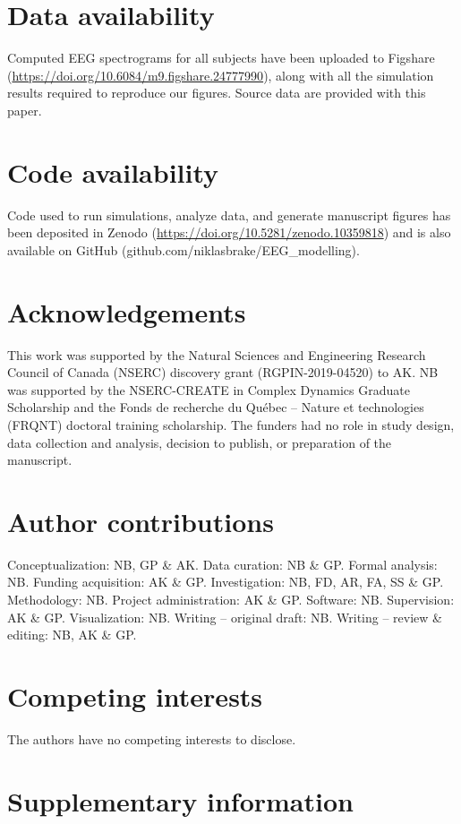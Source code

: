 \section{Data availability}
Computed EEG spectrograms for all subjects have been uploaded to Figshare\cite{Brake2023} (\url{https://doi.org/10.6084/m9.figshare.24777990}), along with all the simulation results required to reproduce our figures. Source data are provided with this paper.

\section{Code availability}
Code used to run simulations, analyze data, and generate manuscript figures\cite{niklas_brake_2023_10359818} has been deposited in Zenodo (\url{https://doi.org/10.5281/zenodo.10359818}) and is also available on GitHub (github.com/niklasbrake/EEG\_modelling).



\section{Acknowledgements}
This work was supported by the Natural Sciences and Engineering Research Council of Canada (NSERC) discovery grant (RGPIN-2019-04520) to AK. NB was supported by the NSERC-CREATE in Complex Dynamics Graduate Scholarship and the Fonds de recherche du Québec – Nature et technologies (FRQNT) doctoral training scholarship. The funders had no role in study design, data collection and analysis, decision to publish, or preparation of the manuscript. 

\section{Author contributions}
Conceptualization: NB, GP \& AK. Data curation: NB \& GP. Formal analysis: NB. Funding acquisition: AK \& GP. Investigation: NB, FD, AR, FA, SS \& GP. Methodology: NB. Project administration: AK \& GP. Software: NB. Supervision: AK \& GP. Visualization: NB. Writing – original draft: NB. Writing – review \& editing: NB, AK \& GP.

\section{Competing interests}
The authors have no competing interests to disclose.

\clearpage

\section{Supplementary information}

